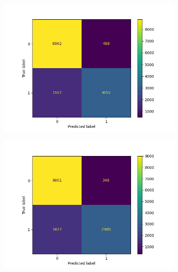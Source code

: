 \begin{figure}
        \begin{subfigure}[b]{0.245\textwidth}  
            \centering 
            \includegraphics[scale=0.35]{"../figs/fig_content_title/fig_ngramKNN_2k=5_content_title.png"}
            \caption{}
        \end{subfigure}
        \begin{subfigure}[b]{0.245\textwidth}
            \centering
            \includegraphics[scale=0.35]{"../figs/fig_content_title/fig_ngramKNN_2k=7_content_title.png"}
            \caption{}
        \end{subfigure}
        \begin{subfigure}[b]{0.245\textwidth}  
            \centering 

\end{subfigure}
\end{figure}
